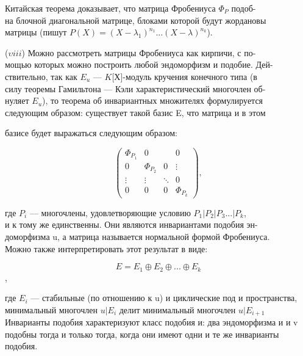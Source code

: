 \documentclass{../template/mai_book}
\begin{document}
\medskip

\noindent Китайская теорема доказывает, что матрица Фробениуса $\Phi_P$ 
подоб-\\на блочной диагональной матрице, блоками которой будут жордановы\\ матрицы (пишут $P(X) = (X-\lambda_1)^{n_1}...(X - \lambda)^{n_k}$).

\medskip

($\upsilon\mathit{iii} $) Можно рассмотреть матрицы Фробениуса как кирпичи, с по-\\мощью которых можно построить любой эндоморфизм и подобие. Дей-\\ствительно, так как $E_u$ — $\mathit{K}$[Х]-модуль кручения конечного типа (в\\силу теоремы Гамильтона — Кэли характеристический многочлен об-\\нуляет $E_u$), то теорема об инвариантных множителях формулируется\\ следующим образом: существует такой базис E, что матрица и в этом

\pagebreak

\noindent базисе будет выражаться следующим образом: 

$$\begin{pmatrix}
\Phi_{P_1} & 0 & \; & 0 \\
0 & \Phi_{P_2} & 0 & \vdots  \\
\vdots & \vdots & \ddots & 0  \\
0 & 0 & 0 & \Phi_{P_k} 
\end{pmatrix},
$$

\smallskip
 
\noindent где $P_i$ — многочлены, удовлетворяющие условию $P_1|P_2|P_3...|P_k$,\\ 
и к тому же единственны. Они являются инвариантами подобия 
эн-\\доморфизма u, а матрица называется нормальной формой Фробениуса.\\ 
Можно также интерпретировать этот результат в виде:


$$ E = E_1\oplus E_2\oplus...\oplus E_k $$,



\noindent где $E_i$ — стабильные (по отношению к u) и циклические под и 
пространства, минимальный многочлен $u|E_i$ делит минимальный 
многочлен $u|E_{i+1}$ Инварианты подобия характеризуют класс подобия и: два 
эндоморфизма и и v подобны тогда и только тогда, когда они имеют 
одни и те же инварианты подобия. 
\end{document}
